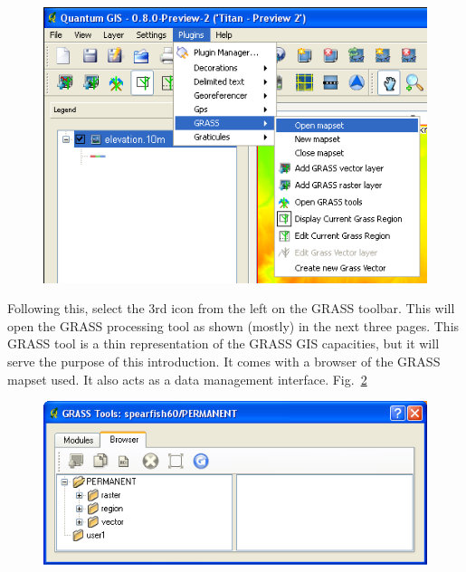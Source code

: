 \begin{figure}[htbp]
   \centering
   \includegraphics[scale=0.35]{qgis029.png}
   \caption{}
   \label{fig:qgis029}
\end{figure}

Following this, select the 3rd icon from the left on
the GRASS toolbar. This will open the GRASS processing tool as shown
(mostly) in the next three pages. This GRASS tool is a thin
representation of the GRASS GIS capacities, but it will serve the
purpose of this introduction. It comes with a browser of the GRASS
mapset used. It also acts as a data management interface. Fig.~\ref{fig:qgis030}

\begin{figure}[htbp]
   \centering
   \includegraphics[scale=0.4]{qgis030.png}
   \caption{}
   \label{fig:qgis030}
\end{figure}


